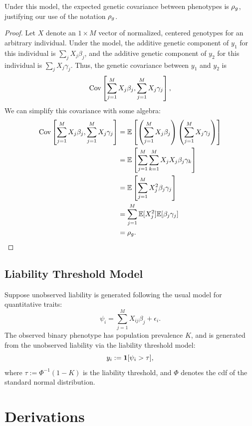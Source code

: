 \documentclass[11pt]{article}
\numberwithin{equation}{section}
\numberwithin{definition}{section}
\numberwithin{thm}{section}
\numberwithin{lemma}{section}
\numberwithin{prop}{section}
\numberwithin{cor}{section}
\numberwithin{hyp}{section}
\begin{document}
\begin{prop} Under this model, the expected genetic covariance between phenotypes is $\rho_g$, justifying our use of the notation $\rho_g$.
\end{prop}
\begin{proof} Let $X$ denote an $1\times M$ vector of normalized, centered genotypes for an arbitrary individual. 
Under the model, the additive genetic component of $y_1$ for this individual is $\sum_j X_j\beta_j$,
and the additive genetic component of $y_2$ for this individual is $\sum_j X_j\gamma_j$.
Thus, the genetic covariance between $y_1$ and $y_2$ is 
$$\mathrm{Cov}\left[\sum_{j=1}^M X_j\beta_j,\sum_{j=1}^M X_j\gamma_j\right],$$ 
\noindent
We can simplify this covariance with some algebra:
\begin{align*}
	\mathrm{Cov}\left[\sum_{j=1}^M X_j\beta_j,\sum_{j=1}^M X_j\gamma_j\right] &= 
		\mathbb{E}\left[\left(\sum_{j=1}^M X_j\beta_j\right)\left(\sum_{j=1}^M X_j\gamma_j\right)\right]\\
		&= \mathbb{E}\left[ \sum_{j=1}^M \sum_{k=1}^M X_jX_j\beta_j\gamma_k\right]\\
		&= \mathbb{E}\left[ \sum_{j=1}^M X_j^2\beta_j\gamma_j \right]\\
		&= \sum_{j=1}^M \mathbb{E}[X_j^2]\mathbb{E}[\beta_j\gamma_j]\\
		&= \rho_g.
\end{align*}
\end{proof}

\subsection{Liability Threshold Model}

Suppose unobserved liability is generated following the usual model for quantitative traits:
\begin{equation*}
	\psi_i = \sum_{j=1}^M X_{ij}\beta_j + \epsilon_i.
\end{equation*}
The observed binary phenotype has population prevalence $K$, 
and is generated from the unobserved liability via the liability threshold model:
\[
	y_i := \mathbf{1}[\psi_i > \tau],
\]
where $\tau:=\Phi^{-1}(1-K)$ is the liability threshold, and
$\Phi$ denotes the cdf of the standard normal distribution.

\section{Derivations}
\end{document}
